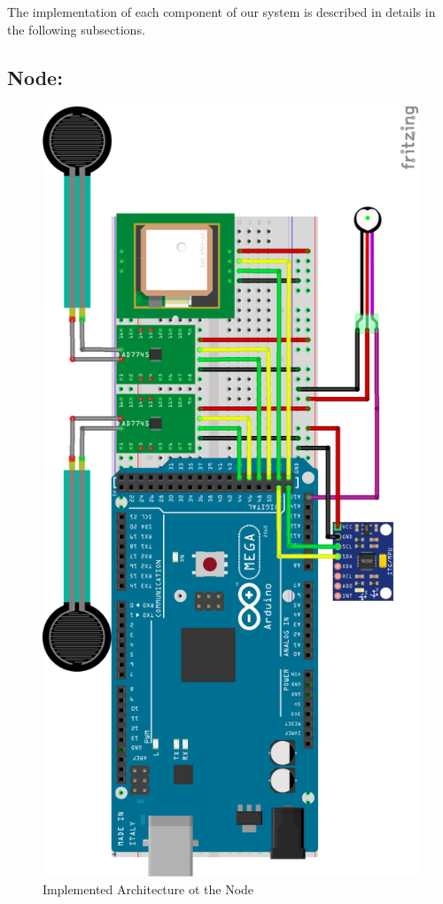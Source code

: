 The implementation of each component of our system is described in details in the following subsections.



\subsection{Node:} 

\begin{figure}[h]
	\centering
	\includegraphics[width=0.8\linewidth]{gfx/node_diagram}
	\caption[]{Implemented Architecture ot the Node}
	\label{fig:architecture_node}
\end{figure}

